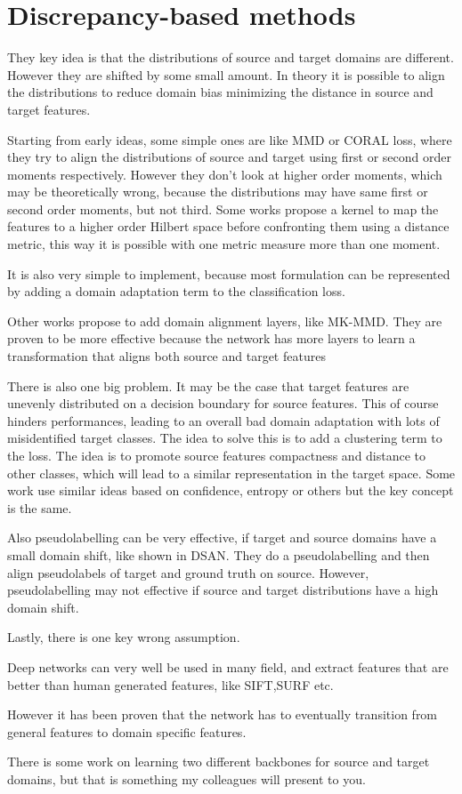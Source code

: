 \section{Discrepancy-based methods}
They key idea is that the distributions of source and target domains are different. However they are shifted by some small amount. In theory it is possible to align the distributions to reduce domain bias minimizing the distance in source and target features.

Starting from early ideas, some simple ones are like MMD or CORAL loss, where they try to align the distributions of source and target using first or second order moments respectively.
However they don’t look at higher order moments, which may be theoretically wrong, because the distributions may have same first or second order moments, but not third.
Some works propose a kernel to map the features to a higher order Hilbert space before confronting them using a distance metric, this way it is possible with one metric measure more than one moment.

It is also very simple to implement, because most formulation can be represented by adding a domain adaptation term to the classification loss.

Other works propose to add domain alignment layers, like MK-MMD. They are proven to be more effective because the network has more layers to learn a transformation that aligns both source and target features

There is also one big problem. It may be the case that target features are unevenly distributed on a decision boundary for source features. This of course hinders performances, leading to an overall bad domain adaptation with lots of misidentified target classes.
The idea to solve this is to add a clustering term to the loss. The idea is to promote source features compactness and distance to other classes, which will lead to a similar representation in the target space. Some work use similar ideas based on confidence, entropy or others but the key concept is the same.

Also pseudolabelling can be very effective, if target and source domains have a small domain shift, like shown in DSAN. They do a pseudolabelling and then align pseudolabels of target and ground truth on source. However, pseudolabelling may not effective if source and target distributions have a high domain shift.


Lastly, there is one key wrong assumption.

Deep networks can very well be used in many field, and extract features that are better than human generated features, like SIFT,SURF etc. 

However it has been proven that the network has to eventually transition from general features to domain specific features. 

There is some work on learning two different backbones for source and target domains, but that is something my colleagues will present to you.
